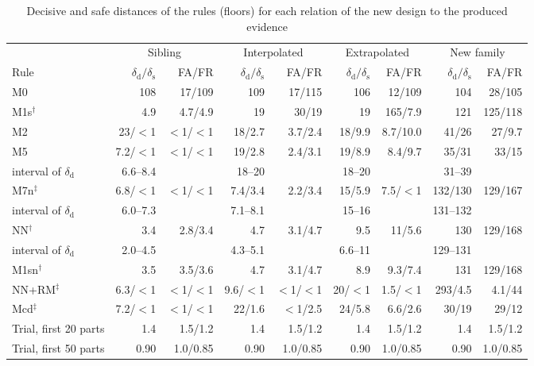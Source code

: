 \documentclass[pdflatex,sn-basic,lineno]{sn-jnl}
\newcommand{\tabsize}{\fontsize{8}{9.5}\selectfont}
\begin{document}
\begin{table}[t]
\tabsize
\setlength{\tabcolsep}{3.4pt}
\caption{Decisive and safe distances of the rules (floors) for each relation of the new design to the produced evidence}\label{tab:distances}
\begin{tabular}{@{}lrrrrrrrr@{}}
\toprule
 & \multicolumn{2}{c}{Sibling} & \multicolumn{2}{c}{Interpolated} & \multicolumn{2}{c}{Extrapolated} & \multicolumn{2}{c}{New family} \\
\cmidrule(lr){2-3}\cmidrule(lr){4-5}\cmidrule(lr){6-7}\cmidrule(lr){8-9}
Rule & $\delta_\mathrm{d}/\delta_\mathrm{s}$ & FA/FR & $\delta_\mathrm{d}/\delta_\mathrm{s}$ & FA/FR & $\delta_\mathrm{d}/\delta_\mathrm{s}$ & FA/FR & $\delta_\mathrm{d}/\delta_\mathrm{s}$ & FA/FR \\
\midrule
M0 & 108 & 17/109 & 109 & 17/115 & 106 & 12/109 & 104 & 28/105 \\
M1s$^\dagger$ & 4.9 & 4.7/4.9 & 19 & 30/19 & 19 & 165/7.9 & 121 & 125/118 \\
M2 & 23/$<$1 & $<$1/$<$1 & 18/2.7 & 3.7/2.4 & 18/9.9 & 8.7/10.0 & 41/26 & 27/9.7 \\
M5 & 7.2/$<$1 & $<$1/$<$1 & 19/2.8 & 2.4/3.1 & 19/8.9 & 8.4/9.7 & 35/31 & 33/15 \\
\quad interval of $\delta_\mathrm{d}$ & 6.6--8.4 &  & 18--20 &  & 18--20 &  & 31--39 & \\
M7n$^\ddagger$ & 6.8/$<$1 & $<$1/$<$1 & 7.4/3.4 & 2.2/3.4 & 15/5.9 & 7.5/$<$1 & 132/130 & 129/167 \\
\quad interval of $\delta_\mathrm{d}$ & 6.0--7.3 &  & 7.1--8.1 &  & 15--16 &  & 131--132 & \\
NN$^\dagger$ & 3.4 & 2.8/3.4 & 4.7 & 3.1/4.7 & 9.5 & 11/5.6 & 130 & 129/168 \\
\quad interval of $\delta_\mathrm{d}$ & 2.0--4.5 &  & 4.3--5.1 &  & 6.6--11 &  & 129--131 & \\
M1sn$^\dagger$ & 3.5 & 3.5/3.6 & 4.7 & 3.1/4.7 & 8.9 & 9.3/7.4 & 131 & 129/168 \\
NN+RM$^\ddagger$ & 6.3/$<$1 & $<$1/$<$1 & 9.6/$<$1 & $<$1/$<$1 & 20/$<$1 & 1.5/$<$1 & 293/4.5 & 4.1/44 \\
Mcd$^\ddagger$ & 7.2/$<$1 & $<$1/$<$1 & 22/1.6 & $<$1/2.5 & 24/5.8 & 6.6/2.6 & 30/19 & 29/12 \\
\midrule Trial, first 20 parts & 1.4 & 1.5/1.2 & 1.4 & 1.5/1.2 & 1.4 & 1.5/1.2 & 1.4 & 1.5/1.2 \\
Trial, first 50 parts & 0.90 & 1.0/0.85 & 0.90 & 1.0/0.85 & 0.90 & 1.0/0.85 & 0.90 & 1.0/0.85 \\

\end{tabular}
\end{table}
\end{document}
